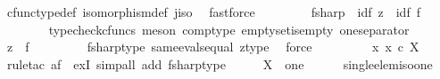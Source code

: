 \begin{isabellebody}
\ cfunc{\isacharunderscore}{\kern0pt}type{\isacharunderscore}{\kern0pt}def\ isomorphism{\isacharunderscore}{\kern0pt}def\ j{\isacharunderscore}{\kern0pt}iso\ \isamarkupfalse%
\ fastforce\ \isanewline
\ \ \ \ \isamarkupfalse%
\ \isamarkupfalse%
\ f{\isacharunderscore}{\kern0pt}sharp\ {\isacharcolon}{\kern0pt}\ {\isachardoublequoteopen}id{\isacharparenleft}{\kern0pt}{\isasymemptyset}{\isacharparenright}{\kern0pt}{\isasymtimes}\isactrlsub f\ z\ {\isacharequal}{\kern0pt}\ id{\isacharparenleft}{\kern0pt}{\isasymemptyset}{\isacharparenright}{\kern0pt}{\isasymtimes}\isactrlsub f\ f\isactrlsup {\isasymsharp}{\isachardoublequoteclose}\isanewline
\ \ \ \ \ \ \isamarkupfalse%
\ {\isacharparenleft}{\kern0pt}typecheck{\isacharunderscore}{\kern0pt}cfuncs{\isacharcomma}{\kern0pt}\ meson\ comp{\isacharunderscore}{\kern0pt}type\ emptyset{\isacharunderscore}{\kern0pt}is{\isacharunderscore}{\kern0pt}empty\ one{\isacharunderscore}{\kern0pt}separator{\isacharparenright}{\kern0pt}\isanewline
\ \ \ \ \isamarkupfalse%
\ \isamarkupfalse%
\ {\isachardoublequoteopen}z\ {\isacharequal}{\kern0pt}\ f\isactrlsup {\isasymsharp}{\isachardoublequoteclose}\isanewline
\ \ \ \ \ \ \isamarkupfalse%
\ \ fsharp{\isacharunderscore}{\kern0pt}type\ same{\isacharunderscore}{\kern0pt}evals{\isacharunderscore}{\kern0pt}equal\ z{\isacharunderscore}{\kern0pt}type\ \isamarkupfalse%
\ force\isanewline
\ \ \isamarkupfalse%
\isanewline
\ \ \isamarkupfalse%
\ \isamarkupfalse%
\ {\isachardoublequoteopen}{\isacharparenleft}{\kern0pt}{\isasymexists}{\isacharbang}{\kern0pt}\ x{\isachardot}{\kern0pt}\ x\ {\isasymin}\isactrlsub c\ X\isactrlbsup {\isasymemptyset}\isactrlesup {\isacharparenright}{\kern0pt}{\isachardoublequoteclose}\isanewline
\ \ \ \ \isamarkupfalse%
\ {\isacharparenleft}{\kern0pt}rule{\isacharunderscore}{\kern0pt}tac\ a{\isacharequal}{\kern0pt}{\isachardoublequoteopen}f\isactrlsup {\isasymsharp}{\isachardoublequoteclose}\ \ ex{}I{\isacharcomma}{\kern0pt}\ simp{\isacharunderscore}{\kern0pt}all\ add{\isacharcolon}{\kern0pt}\ fsharp{\isacharunderscore}{\kern0pt}type{\isacharparenright}{\kern0pt}\isanewline
\ \ \isamarkupfalse%
\ \isamarkupfalse%
\ {\isachardoublequoteopen}X\isactrlbsup {\isasymemptyset}\isactrlesup \ {\isasymcong}\ one{\isachardoublequoteclose}\isanewline
\ \ \ \ \isamarkupfalse%
\ single{\isacharunderscore}{\kern0pt}elem{\isacharunderscore}{\kern0pt}iso{\isacharunderscore}{\kern0pt}one\ \isamarkupfalse%

\end{isabellebody}
